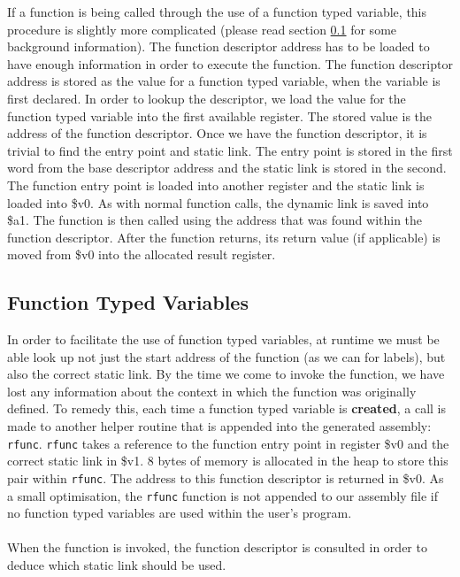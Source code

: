 \begin{description}
	If a function is being called through the use of a function typed variable, this procedure is slightly more complicated (please read section \ref{sec:ftv} for some background information). The function descriptor address has to be loaded to have enough information in order to execute the function. The function descriptor address is stored as the value for a function typed variable, when the variable is first declared. In order to lookup the descriptor, we load the value for the function typed variable into the first available register. The stored value is the address of the function descriptor. Once we have the function descriptor, it is trivial to find the entry point and static link. The entry point is stored in the first word from the base descriptor address and the static link is stored in the second. The function entry point is loaded into another register and the static link is loaded into \$v0. As with normal function calls, the dynamic link is saved into \$a1. The function is then called using the address that was found within the function descriptor. After the function returns, its return value (if applicable) is moved from \$v0 into the allocated result register.
\end{description}

\subsection{Function Typed Variables}
\label{sec:ftv}
In order to facilitate the use of function typed variables, at runtime we must be able look up not just the start address of the function (as we can for labels), but also the correct static link. By the time we come to invoke the function, we have lost any information about the context in which the function was originally defined. To remedy this, each time a function typed variable is \textbf{created}, a call is made to another helper routine that is appended into the generated assembly: \verb!rfunc!. \verb!rfunc! takes a reference to the function entry point in register \$v0 and the correct static link in \$v1. 8 bytes of memory is allocated in the heap to store this pair within \verb!rfunc!. The address to this function descriptor is returned in \$v0. As a small optimisation, the \verb!rfunc! function is not appended to our assembly file if no function typed variables are used within the user's program.
\ \\ \ \\
When the function is invoked, the function descriptor is consulted in order to deduce which static link should be used.


